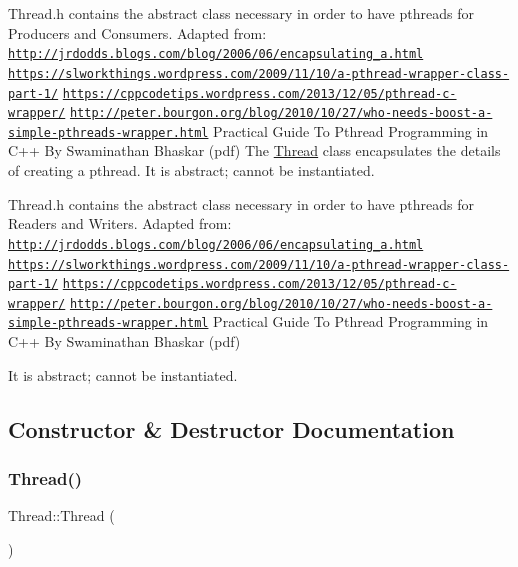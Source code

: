 Thread.\+h contains the abstract class necessary in order to have pthreads for Producers and Consumers. Adapted from\+: \href{http://jrdodds.blogs.com/blog/2006/06/encapsulating_a.html}{\tt http\+://jrdodds.\+blogs.\+com/blog/2006/06/encapsulating\+\_\+a.\+html} \href{https://slworkthings.wordpress.com/2009/11/10/a-pthread-wrapper-class-part-1/}{\tt https\+://slworkthings.\+wordpress.\+com/2009/11/10/a-\/pthread-\/wrapper-\/class-\/part-\/1/} \href{https://cppcodetips.wordpress.com/2013/12/05/pthread-c-wrapper/}{\tt https\+://cppcodetips.\+wordpress.\+com/2013/12/05/pthread-\/c-\/wrapper/} \href{http://peter.bourgon.org/blog/2010/10/27/who-needs-boost-a-simple-pthreads-wrapper.html}{\tt http\+://peter.\+bourgon.\+org/blog/2010/10/27/who-\/needs-\/boost-\/a-\/simple-\/pthreads-\/wrapper.\+html} Practical Guide To Pthread Programming in C++ By Swaminathan Bhaskar (pdf) The \hyperlink{class_thread}{Thread} class encapsulates the details of creating a pthread. It is abstract; cannot be instantiated.

Thread.\+h contains the abstract class necessary in order to have pthreads for Readers and Writers. Adapted from\+: \href{http://jrdodds.blogs.com/blog/2006/06/encapsulating_a.html}{\tt http\+://jrdodds.\+blogs.\+com/blog/2006/06/encapsulating\+\_\+a.\+html} \href{https://slworkthings.wordpress.com/2009/11/10/a-pthread-wrapper-class-part-1/}{\tt https\+://slworkthings.\+wordpress.\+com/2009/11/10/a-\/pthread-\/wrapper-\/class-\/part-\/1/} \href{https://cppcodetips.wordpress.com/2013/12/05/pthread-c-wrapper/}{\tt https\+://cppcodetips.\+wordpress.\+com/2013/12/05/pthread-\/c-\/wrapper/} \href{http://peter.bourgon.org/blog/2010/10/27/who-needs-boost-a-simple-pthreads-wrapper.html}{\tt http\+://peter.\+bourgon.\+org/blog/2010/10/27/who-\/needs-\/boost-\/a-\/simple-\/pthreads-\/wrapper.\+html} Practical Guide To Pthread Programming in C++ By Swaminathan Bhaskar (pdf)

It is abstract; cannot be instantiated. 

\subsection{Constructor \& Destructor Documentation}
\mbox{\label{class_thread_a95c703fb8f2f27cb64f475a8c940864a}} 
\subsubsection{\texorpdfstring{Thread()}{Thread()}\hspace{0.1cm}{\footnotesize\ttfamily [1/2]}}
{\footnotesize\ttfamily Thread\+::\+Thread (\begin{DoxyParamCaption}{ }\end{DoxyParamCaption})}



